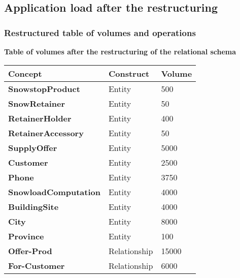{\pagebreak

\subsection{Application load after the restructuring}

\subsubsection{Restructured table of volumes and operations}

\vspace{12px}

{\centering \textbf{Table of volumes after the restructuring of the relational schema}\\}

\begin{table}[H]
  \def\arraystretch{1.25}%
  \centering
  \begin{tabular}{ | m{4.5cm} | m{4.5cm}| m{4.5cm} |}
    \hline
    {\textbf{\large Concept}} & {\textbf{\large Construct}} & {\textbf{\large Volume}} \\
    \hline
    \color[HTML]{3531FF} \textbf{SnowstopProduct} & Entity & 500  \\
    \hline
    \color[HTML]{3531FF} \textbf{SnowRetainer} & Entity & 50 \\
    \hline
    \color[HTML]{3531FF} \textbf{RetainerHolder} & Entity & 400 \\
    \hline
    \color[HTML]{3531FF} \textbf{RetainerAccessory} & Entity & 50 \\
    \hline
    \color[HTML]{3531FF} \textbf{SupplyOffer} & Entity & 5000\\
    \hline
    \color[HTML]{3531FF} \textbf{Customer} & Entity & 2500\\
    \hline
    \color[HTML]{3531FF} \textbf{Phone} & Entity & 3750 \\
    \hline
    \color[HTML]{3531FF} \textbf{SnowloadComputation} & Entity & 4000\\
    \hline
    \color[HTML]{3531FF} \textbf{BuildingSite} & Entity & 4000\\
    \hline
    \color[HTML]{3531FF} \textbf{City} & Entity & 8000 \\
    \hline
    \color[HTML]{3531FF} \textbf{Province} & Entity & 100 \\
    \hline
    \color[HTML]{3531FF} \textbf{Offer-Prod} & Relationship & 15000\\
    \hline
    \color[HTML]{3531FF} \textbf{For-Customer} & Relationship & 6000\\
    \hline
  \end{tabular}
\end{table}

}
